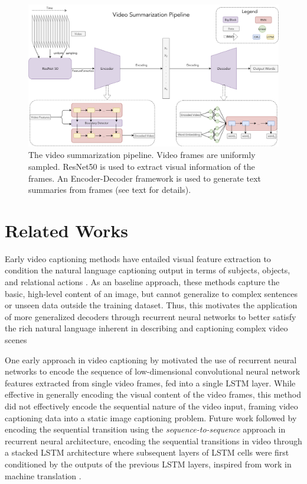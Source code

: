 \documentclass[11pt,a4paper]{article}
\begin{document}
\begin{figure}
    \centering
    \includegraphics[scale=0.18]{pipeline.png}
    \caption{The video summarization pipeline. Video frames are uniformly sampled. ResNet50 \cite{DBLP:journals/corr/HeZRS15} is used to extract visual information of the frames. An Encoder-Decoder framework is used to generate text summaries from frames (see text for details).}
    \label{fig:pipeline}
\end{figure}

\section{Related Works}

Early video captioning methods have entailed visual feature extraction to
condition the natural language captioning output in terms of subjects, objects,
and relational actions \cite{6c13e0e7819f435599f2cc315c48d790,
krishnamoorthy2013generating, C14-1115}. As an baseline approach, these methods
capture the basic, high-level content of an image, but cannot generalize to
complex sentences or unseen data outside the training dataset. Thus, this
motivates the application of more generalized decoders through recurrent neural
networks to better satisfy the rich natural language inherent in describing and
captioning complex video scenes \cite{DBLP:journals/corr/abs-1808-03314,
DBLP:journals/corr/abs-1801-01078, DBLP:journals/corr/Lipton15, hochreiter1997long, olah_2015}

One early approach in video captioning by
\citet{DBLP:journals/corr/VenugopalanXDRMS14}
motivated the use of recurrent neural networks to encode the sequence of
low-dimensional convolutional neural network features extracted from single
video frames, fed into a single LSTM layer. While effective in generally
encoding the visual content of the video frames, this method did not effectively
encode the sequential nature of the video input, framing video captioning data
into a static image captioning problem. Future work followed by encoding the
sequential transition using the \textit{sequence-to-sequence} approach in
recurrent neural architecture, encoding the sequential transitions in video
through a stacked LSTM architecture where subsequent layers of LSTM cells were
first conditioned by the outputs of the previous LSTM layers, inspired from work
in machine translation \cite{DBLP:journals/corr/SutskeverVL14}. 
\end{document}
